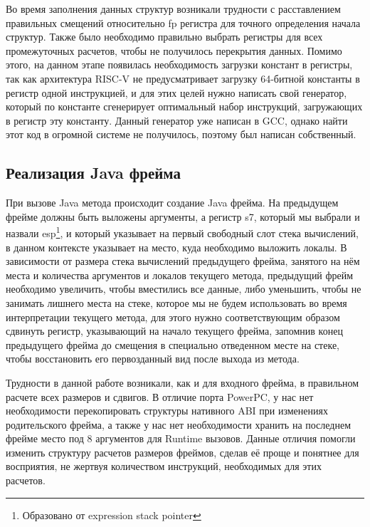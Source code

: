  
Во время заполнения данных структур возникали трудности с расставлением правильных смещений относительно fp регистра для точного определения начала структур. Также было необходимо правильно выбрать регистры для всех промежуточных расчетов, чтобы не получилось перекрытия данных. Помимо этого, на данном этапе появилась необходимость загрузки констант в регистры, так как архитектура RISC-V не предусматривает загрузку 64-битной константы в регистр одной инструкцией, и для этих целей нужно написать свой генератор, который по константе сгенерирует оптимальный набор инструкций, загружающих в регистр эту константу. Данный генератор уже написан в GCC, однако найти этот код в огромной системе не получилось, поэтому был написан собственный.





\subsection{Реализация Java фрейма}
При вызове Java метода происходит создание Java фрейма. На предыдущем фрейме должны быть выложены аргументы, а регистр s7, который мы выбрали и назвали esp\footnote{Образовано от expression stack pointer}, и который указывает на первый свободный слот стека вычислений, в данном контексте указывает на место, куда необходимо выложить локалы. В зависимости от размера стека вычислений предыдущего фрейма, занятого на нём места и количества аргументов и локалов текущего метода, предыдущий фрейм необходимо увеличить, чтобы вместились все данные, либо уменьшить, чтобы не занимать лишнего места на стеке, которое мы не будем использовать во время интерпретации текущего метода, для этого нужно соответствующим образом сдвинуть регистр, указывающий на начало текущего фрейма, запомнив конец предыдущего фрейма до смещения в специально отведенном месте на стеке, чтобы восстановить его первозданный вид после выхода из метода.

Трудности в данной работе возникали, как и для входного фрейма, в правильном расчете всех размеров и сдвигов. В отличие порта PowerPC, у нас нет необходимости перекопировать структуры нативного ABI при изменениях родительского фрейма, а также у нас нет необходимости хранить на последнем фрейме место под 8 аргументов для Runtime вызовов. Данные отличия помогли изменить структуру расчетов размеров фреймов, сделав её проще и понятнее для восприятия, не жертвуя количеством инструкций, необходимых для этих расчетов.

